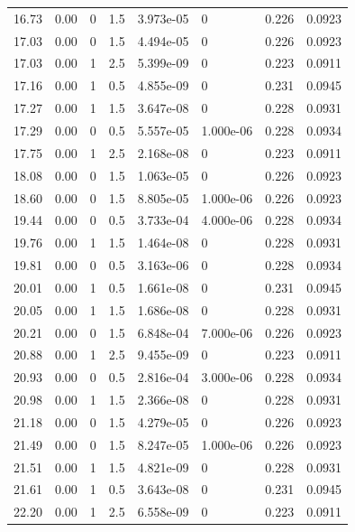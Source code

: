 \documentclass[preview]{standalone}
\begin{document}
{{{\begin{tabular}{L{1.2cm}C{1.2cm} C{0.3cm}C{0.5cm} C{1.4cm}C{1.4cm} C{1.4cm}C{1.4cm}}
  16.73  &  0.00  & 0     & 1.5 &  3.973e-05  & 0  & 0.226 &  0.0923   \\ 
  17.03  &  0.00  & 0     & 1.5 &  4.494e-05  & 0  & 0.226 &  0.0923   \\ 
  17.03  &  0.00  & 1     & 2.5 &  5.399e-09  & 0  & 0.223 &  0.0911   \\ 
  17.16  &  0.00  & 1     & 0.5 &  4.855e-09  & 0  & 0.231 &  0.0945   \\ 
  17.27  &  0.00  & 1     & 1.5 &  3.647e-08  & 0  & 0.228 &  0.0931   \\ 
  17.29  &  0.00  & 0     & 0.5 &  5.557e-05  & 1.000e-06  & 0.228 &  0.0934   \\ 
  17.75  &  0.00  & 1     & 2.5 &  2.168e-08  & 0  & 0.223 &  0.0911   \\ 
  18.08  &  0.00  & 0     & 1.5 &  1.063e-05  & 0  & 0.226 &  0.0923   \\ 
  18.60  &  0.00  & 0     & 1.5 &  8.805e-05  & 1.000e-06  & 0.226 &  0.0923   \\ 
  19.44  &  0.00  & 0     & 0.5 &  3.733e-04  & 4.000e-06  & 0.228 &  0.0934   \\ 
  19.76  &  0.00  & 1     & 1.5 &  1.464e-08  & 0  & 0.228 &  0.0931   \\ 
  19.81  &  0.00  & 0     & 0.5 &  3.163e-06  & 0  & 0.228 &  0.0934   \\ 
  20.01  &  0.00  & 1     & 0.5 &  1.661e-08  & 0  & 0.231 &  0.0945   \\ 
  20.05  &  0.00  & 1     & 1.5 &  1.686e-08  & 0  & 0.228 &  0.0931   \\ 
  20.21  &  0.00  & 0     & 1.5 &  6.848e-04  & 7.000e-06  & 0.226 &  0.0923   \\ 
  20.88  &  0.00  & 1     & 2.5 &  9.455e-09  & 0  & 0.223 &  0.0911   \\ 
  20.93  &  0.00  & 0     & 0.5 &  2.816e-04  & 3.000e-06  & 0.228 &  0.0934   \\ 
  20.98  &  0.00  & 1     & 1.5 &  2.366e-08  & 0  & 0.228 &  0.0931   \\ 
  21.18  &  0.00  & 0     & 1.5 &  4.279e-05  & 0  & 0.226 &  0.0923   \\ 
  21.49  &  0.00  & 0     & 1.5 &  8.247e-05  & 1.000e-06  & 0.226 &  0.0923   \\ 
  21.51  &  0.00  & 1     & 1.5 &  4.821e-09  & 0  & 0.228 &  0.0931   \\ 
  21.61  &  0.00  & 1     & 0.5 &  3.643e-08  & 0  & 0.231 &  0.0945   \\ 
  22.20  &  0.00  & 1     & 2.5 &  6.558e-09  & 0  & 0.223 &  0.0911   \\ 

\end{tabular}}}}
\end{document}
